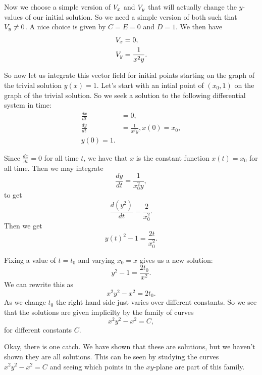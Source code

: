 Now we choose a simple version of \(V_x\) and \(V_y\) that will actually change the \(y\)-values of our
initial solution. So we need a simple version of both such that \(V_y \neq 0\). A nice choice is given
by \(C = E = 0\) and \(D = 1\). We then have
\begin{align}
V_x & = 0, \\
V_y & = \frac{1}{x^2y}.
\end{align}

So now let us integrate this vector field for initial points starting on the graph of the trivial solution
\(y(x) = 1\). Let's start with an intial point of \((x_0, 1)\) on the graph of the trivial solution. So
we seek a solution to the following differential system in time:
\begin{align}
\frac{dx}{dt} & = 0, \\
\frac{dy}{dt} & = \frac{1}{x^2y}, 
x(0) = x_0, \\
y(0) = 1.
\end{align}

Since \(\frac{dx}{dt} = 0\) for all time \(t\), we have that \(x\) is the constant function
\(x(t) = x_0\) for all time. Then we may integrate
\begin{equation}
\frac{dy}{dt} = \frac{1}{x_0^2 y},
\end{equation}
to get
\begin{equation}
\frac{d(y^2)}{dt} = \frac{2}{x_0^2}.
\end{equation}
Then we get
\begin{equation}
y(t)^2 - 1 = \frac{2t}{x_0^2}.
\end{equation}

Fixing a value of \(t = t_0\) and varying \(x_0 = x\) gives us a new solution:
\begin{equation}
y^2 - 1 = \frac{2t_0}{x^2}.
\end{equation}
We can rewrite this as
\begin{equation}
x^2y^2 - x^2 = 2t_0.
\end{equation} 
As we change \(t_0\) the right hand side just varies over different constants. So we see that the solutions
are given implicilty by the family of curves
\begin{equation}
x^2 y^2 - x^2 = C,
\end{equation}
for different constants \(C\).

Okay, there is one catch. We have shown that these are solutions, but we haven't shown they are all solutions.
This can be seen by studying the curves \(x^2 y^2 - x^2 = C\) and seeing which points in the \(xy\)-plane are
part of this family.
